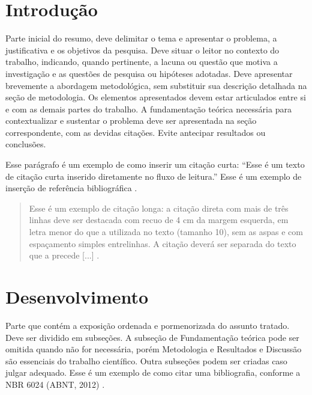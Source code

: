 \documentclass[a4paper, 12pt, twoside]{article}
\begin{document}
\qabstract{Abstract}{Keywords}{SDG}{%
O abstract é a versão integral do resumo traduzido para inglês. Também as palavras-chave e o ODS devem ser traduzidos adequadamente.
}{ %
palavra-chave 1. palavra-chave 2. palavra-chave 3. palavra-chave opcional.
}{ %
Escolher um dos tópicos em \url{https://sdgs.un.org/goals}
}


\section{Introdução}

Parte inicial do resumo, deve delimitar o tema e apresentar o problema, a
justificativa e os objetivos da pesquisa. Deve situar o leitor no contexto do
trabalho, indicando, quando pertinente, a lacuna ou questão que motiva a
investigação e as questões de pesquisa ou hipóteses adotadas. Deve apresentar
brevemente a abordagem metodológica, sem substituir sua descrição detalhada
na seção de metodologia. Os elementos apresentados devem estar articulados
entre si e com as demais partes do trabalho. A fundamentação teórica necessária para contextualizar e sustentar o problema deve ser apresentada na seção correspondente, com as devidas citações. Evite antecipar resultados ou conclusões.

Esse parágrafo é um exemplo de como inserir um citação curta: \enquote{Esse é um texto de citação curta inserido diretamente no fluxo de leitura.} Esse é um exemplo de inserção de referência bibliográfica \cite{bittar2001linguagem}.

\begin{quote}
Esse é um exemplo de citação longa: a citação direta com mais de três linhas deve ser destacada com recuo de 4 cm da margem esquerda, em letra menor do que a utilizada no texto (tamanho 10), sem as aspas e com espaçamento simples entrelinhas. A citação deverá ser separada do texto que a precede [...] \cite{ufc2017guia}.
\end{quote}

\section{Desenvolvimento}

Parte que contém a exposição ordenada e pormenorizada do assunto tratado.
Deve ser dividido em subseções. A subseção de Fundamentação teórica pode ser omitida quando não for necessária, porém Metodologia e Resultados e Discussão são essenciais do trabalho científico. Outra subseções podem ser criadas caso julgar adequado. Esse é um exemplo de como citar uma bibliografia, conforme a NBR 6024 (ABNT, 2012) \cite{Mauricio}.
\end{document}
